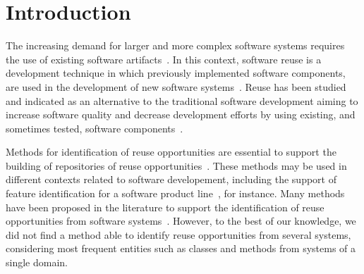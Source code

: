 
\chapter{Introduction}
\label{ch:introduction}

The increasing demand for larger and more complex software systems requires the use of existing software artifacts~\citep{Pohl:2005}. In this context, software reuse is a development technique in which previously implemented software components, are used in the development of new software systems~\citep{krueger1992software}. Reuse has been studied and indicated as an alternative to the traditional software development aiming to increase software quality and decrease development efforts by using existing, and sometimes tested, software components~\citep{mohagheghi2007quality,morisio:2002,ravichandran2003software}.

Methods for identification of reuse opportunities are essential to support the building of repositories of reuse opportunities~\citep{guo2000survey}. These methods may be used in different contexts related to software developement, including the support of feature identification  for a software product line~\citep{lee2004feature}, for instance. Many methods have been proposed in the literature to support the identification  of reuse opportunities from software systems~\citep{caldiera1991identifying,Kawaguchi2004,Kuhn:2007,maarek1991information,Ye:2005}. However, to the best of our knowledge, we did not find a method able to identify reuse opportunities from several systems, considering most frequent entities such as classes and methods from systems of a single domain.


